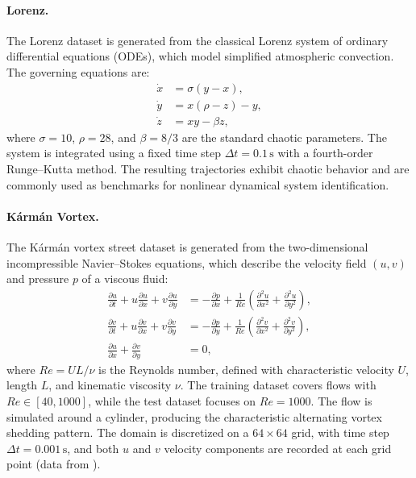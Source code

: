 \documentclass{article} %
\begin{document}
\paragraph{Lorenz.} 
The Lorenz dataset is generated from the classical Lorenz system of ordinary differential equations (ODEs), which model simplified atmospheric convection. The governing equations are:
\begin{equation}
\begin{aligned}
\dot{x} &= \sigma (y - x), \\
\dot{y} &= x(\rho - z) - y, \\
\dot{z} &= xy - \beta z,
\end{aligned}
\end{equation}
where $\sigma = 10$, $\rho = 28$, and $\beta = 8/3$ are the standard chaotic parameters. The system is integrated using a fixed time step $\Delta t = 0.1 \,\text{s}$ with a fourth-order Runge–Kutta method. The resulting trajectories exhibit chaotic behavior and are commonly used as benchmarks for nonlinear dynamical system identification.

\paragraph{Kármán Vortex.}
The Kármán vortex street dataset is generated from the two-dimensional incompressible Navier–Stokes equations, which describe the velocity field $(u,v)$ and pressure $p$ of a viscous fluid:
\begin{equation}
\begin{aligned}
\frac{\partial u}{\partial t} + u \frac{\partial u}{\partial x} + v \frac{\partial u}{\partial y} &= -\frac{\partial p}{\partial x} + \frac{1}{Re} \left( \frac{\partial^2 u}{\partial x^2} + \frac{\partial^2 u}{\partial y^2} \right), \\
\frac{\partial v}{\partial t} + u \frac{\partial v}{\partial x} + v \frac{\partial v}{\partial y} &= -\frac{\partial p}{\partial y} + \frac{1}{Re} \left( \frac{\partial^2 v}{\partial x^2} + \frac{\partial^2 v}{\partial y^2} \right), \\
\frac{\partial u}{\partial x} + \frac{\partial v}{\partial y} &= 0,
\end{aligned}
\end{equation}
where $Re = U L / \nu$ is the Reynolds number, defined with characteristic velocity $U$, length $L$, and kinematic viscosity $\nu$. The training dataset covers flows with $Re \in [40,1000]$, while the test dataset focuses on $Re=1000$. The flow is simulated around a cylinder, producing the characteristic alternating vortex shedding pattern. The domain is discretized on a $64 \times 64$ grid, with time step $\Delta t = 0.001 \,\text{s}$, and both $u$ and $v$ velocity components are recorded at each grid point (data from \citep{Luo2023cfdbench}).
\end{document}
